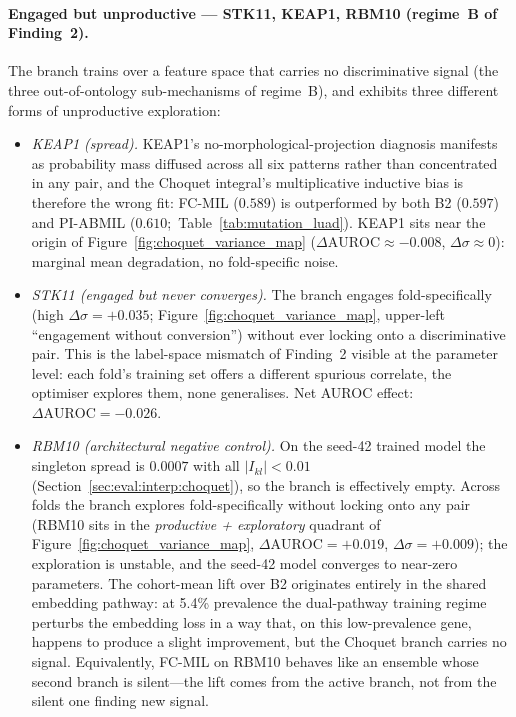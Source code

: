 \paragraph{Engaged but unproductive --- STK11, KEAP1, RBM10
(regime~B of Finding~2).}
The branch trains over a feature space that carries no
discriminative signal (the three out-of-ontology sub-mechanisms
of regime~B), and exhibits three different forms of unproductive
exploration:
\begin{itemize}
  \item \emph{KEAP1 (spread).}
  KEAP1's no-morphological-projection diagnosis manifests as
  probability mass diffused across all six patterns rather than
  concentrated in any pair, and the Choquet integral's
  multiplicative inductive bias is therefore the wrong fit:
  FC-MIL ($0.589$) is outperformed by both B2 ($0.597$) and
  PI-ABMIL ($0.610$;~Table~\ref{tab:mutation_luad}).
  KEAP1 sits near the origin of
  Figure~\ref{fig:choquet_variance_map}
  ($\Delta\mathrm{AUROC} \approx -0.008$, $\Delta\sigma \approx 0$):
  marginal mean degradation, no fold-specific noise.
  \item \emph{STK11 (engaged but never converges).}
  The branch engages fold-specifically (high
  $\Delta\sigma = +0.035$;
  Figure~\ref{fig:choquet_variance_map}, upper-left
  ``engagement without conversion'') without ever locking onto a
  discriminative pair.
  This is the label-space mismatch of Finding~2 visible at the
  parameter level: each fold's training set offers a different
  spurious correlate, the optimiser explores them, none generalises.
  Net AUROC effect: $\Delta\mathrm{AUROC} = -0.026$.
  \item \emph{RBM10 (architectural negative control).}
  On the seed-42 trained model the singleton spread is $0.0007$
  with all $|I_{kl}| < 0.01$
  (Section~\ref{sec:eval:interp:choquet}), so the branch is
  effectively empty.
  Across folds the branch explores fold-specifically without
  locking onto any pair (RBM10 sits in the
  \emph{productive + exploratory} quadrant of
  Figure~\ref{fig:choquet_variance_map},
  $\Delta\mathrm{AUROC} = +0.019$, $\Delta\sigma = +0.009$); the
  exploration is unstable, and the seed-42 model converges to
  near-zero parameters.
  The cohort-mean lift over B2 originates entirely in the shared
  embedding pathway: at 5.4\% prevalence the dual-pathway training
  regime perturbs the embedding loss in a way that, on this
  low-prevalence gene, happens to produce a slight improvement,
  but the Choquet branch carries no signal.
  Equivalently, FC-MIL on RBM10 behaves like an ensemble whose
  second branch is silent---the lift comes from the active branch,
  not from the silent one finding new signal.
\end{itemize}

